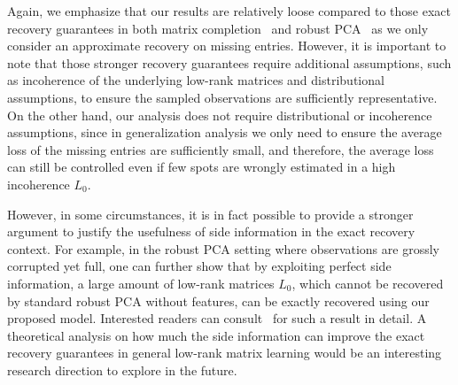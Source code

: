 \documentclass[twoside,11pt]{article}
\def\realL{L_0}
\begin{document}
Again, we emphasize that our results are relatively loose
compared to those exact recovery guarantees
in both matrix completion~\citep{Candes09a, Candes12a}
and robust PCA~\citep{VC11a, Candes11a} as we only consider
an approximate recovery on missing entries.  However,
it is important to note that those stronger recovery
guarantees require additional assumptions, such as incoherence
of the underlying low-rank matrices and distributional assumptions,
to ensure the sampled observations are
sufficiently representative.  On the other hand, our analysis does not
require distributional or incoherence assumptions, since in generalization analysis
we only need to ensure the average loss of the missing entries are sufficiently small,
and therefore, the average loss can still be controlled even if
few spots are wrongly estimated in a high incoherence $\realL$.

However, in some circumstances, it is in fact possible to provide a stronger argument to
justify the usefulness of side information in the exact recovery context.  For example,
in the robust PCA setting where observations are grossly corrupted yet full,
one can further show that by exploiting perfect side information, a large amount of
low-rank matrices $\realL$, which cannot be recovered by standard robust PCA
without features, can be exactly recovered using our proposed model.
Interested readers can consult~\citet{Chiang16a} for such a result in detail.
A theoretical analysis on how much the side information can improve the exact
recovery guarantees in general low-rank matrix learning would be an interesting
research direction to explore in the future.
\end{document}
